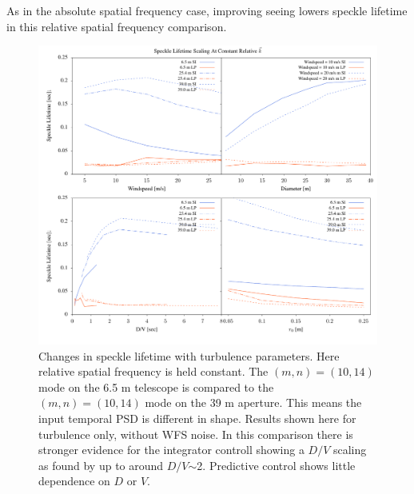 \documentclass[10pt,preprint]{aastex631}
\begin{document}
As in the absolute spatial frequency case, improving seeing lowers speckle lifetime in this relative spatial frequency comparison.

\begin{figure}
\includegraphics[width=5.5in]{scalings_rel.pdf}
\caption{Changes in speckle lifetime with turbulence parameters.  Here relative spatial frequency is held constant.  The $(m,n)=(10,14)$ mode on the 6.5 m telescope is compared to the $(m,n)=(10,14)$ mode on the 39 m aperture.  This means the input temporal PSD is different in shape.  Results shown here for turbulence only, without WFS noise. In this comparison there is stronger evidence for the integrator controll showing a $D/V$ scaling as found by \citet{2005SPIE.5903..170M} up to around $D/V$$\sim$2. Predictive control shows little dependence on $D$ or $V$.  
\label{fig:scalings_rel}
}
\end{figure}
\end{document}
